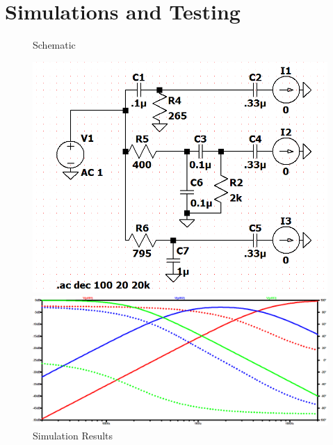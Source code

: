 \documentclass{article}
\begin{document}
\section*{Simulations and Testing}

\begin{figure}[!h]
\centering
\caption{Schematic}
\includegraphics[scale=.5]{lab6_spice_schematic}
\caption{Simulation Results}
\includegraphics[width=\linewidth]{lab6_spice_graph}
\end{figure}
\end{document}
